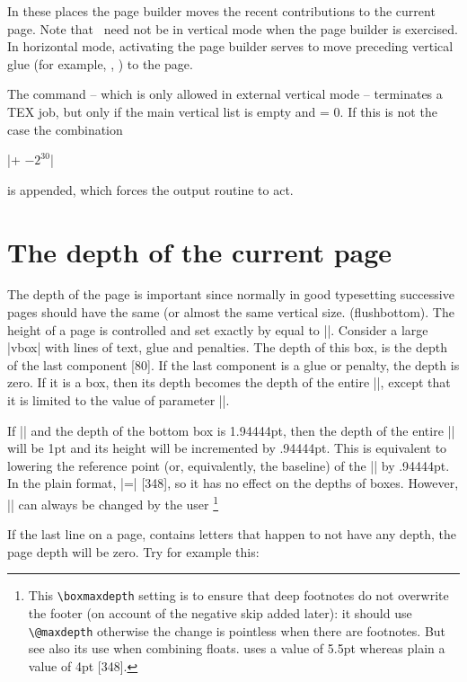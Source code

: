 In these places the page builder moves the recent contributions to the current page. Note that
\tex\  need not be in vertical mode when the page builder is exercised. In horizontal mode,
activating the page builder serves to move preceding vertical glue (for example, ,
) to the page.

The  command – which is only allowed in external vertical mode – terminates a TEX job,
but only if the main vertical list is empty and  = 0. If this is not the case the
combination


|\hbox{}\vfill\penalty+ $-2^{30}$|

is appended, which forces the output routine to act.

\section{The depth of the current page}
The depth of the page is important since normally in good typesetting successive pages should have the same (or almost the same vertical size. (flushbottom). The height of a page is controlled and set exactly by \tex equal to |\vsize|. Consider a large |vbox| with lines of text, glue and penalties. The depth of this box, is the depth of the last component [80]. If the last component is a glue or penalty, the depth is zero. If it is a box, then its depth becomes the depth of the entire |\vbox|, except that it is limited to the value of parameter |\boxmaxdepth|.

If
|\boxmaxdepth=1pt| and the depth of the bottom box
is 1.94444pt, then the depth of the entire |\vbox|
will be 1pt and its height will be incremented
by .94444pt. This is equivalent to lowering the
reference point (or, equivalently, the baseline) of
the |\vbox| by .94444pt. In the plain format,
|\boxmaxdepth=\maxdimen| [348], so it has no effect
on the depths of boxes. However, |\boxmaxdepth|
can always be changed by the user \footnote{This \texttt{\textbackslash boxmaxdepth} setting is to ensure that deep footnotes do not overwrite the
footer (on account of the negative skip added later): it should use \texttt{\textbackslash @maxdepth}
otherwise the change is pointless when there are footnotes.
But see also its use when combining 
floats.  \latex uses a value of 5.5pt whereas plain a value of 4pt [348].}



If the last line on a page, contains letters that happen to not have any depth, the page depth will be zero. Try for example this:

